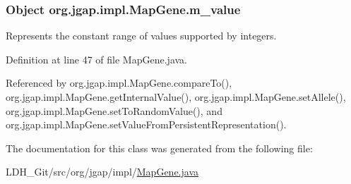 \hypertarget{classorg_1_1jgap_1_1impl_1_1_map_gene_a22a2a9132722ecd9188dffc593722df0}{
\subsubsection[{m\-\_\-value}]{\setlength{\rightskip}{0pt plus 5cm}Object org.\-jgap.\-impl.\-Map\-Gene.\-m\-\_\-value\hspace{0.3cm}{\ttfamily [private]}}}\label{classorg_1_1jgap_1_1impl_1_1_map_gene_a22a2a9132722ecd9188dffc593722df0}
Represents the constant range of values supported by integers. 

Definition at line 47 of file Map\-Gene.\-java.



Referenced by org.\-jgap.\-impl.\-Map\-Gene.\-compare\-To(), org.\-jgap.\-impl.\-Map\-Gene.\-get\-Internal\-Value(), org.\-jgap.\-impl.\-Map\-Gene.\-set\-Allele(), org.\-jgap.\-impl.\-Map\-Gene.\-set\-To\-Random\-Value(), and org.\-jgap.\-impl.\-Map\-Gene.\-set\-Value\-From\-Persistent\-Representation().



The documentation for this class was generated from the following file\-:\begin{DoxyCompactItemize}
\item 
L\-D\-H\-\_\-\-Git/src/org/jgap/impl/\hyperlink{_map_gene_8java}{Map\-Gene.\-java}\end{DoxyCompactItemize}
